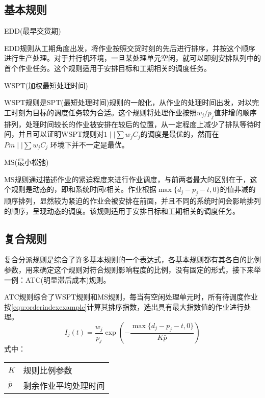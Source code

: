 \subsection{基本规则}
\begin{asparaenum}
\item EDD(最早交货期)

EDD规则从工期角度出发，将作业按照交货时刻的先后进行排序，并按这个顺序进行生产处理。对于并行机环境，一旦某处理单元空闲，就可以即刻安排队列中的首个作业任务。这个规则适用于安排目标和工期相关的调度任务。
\item WSPT(加权最短处理时间)

WSPT规则是SPT(最短处理时间)规则的一般化，从作业的处理时间出发，对以完工时刻为目标的调度任务较为合适。这个规则将处理作业按照$w_j/p_j$值非增的顺序排列，处理时间较长的作业被安排在较后的位置，从一定程度上减少了排队等待时间，并且可以证明WSPT规则对$1\mid \mid \sum w_jC_j$的调度是最优的\cite{pinedo}，然而在$Pm \mid \mid \sum w_jC_j$ 环境下并不一定是最优。

\item MS(最小松弛)
\end{asparaenum}

MS规则通过描述作业的紧迫程度来进行作业调度，与前两者最大的区别在于，这个规则是动态的，即和系统时间$t$相关。作业根据$\max \{d_j - p_j - t , 0\}$的值非减的顺序排列，显然较为紧迫的作业会被安排在前面，并且不同的系统时间会影响排列的顺序，呈现动态的调度。该规则适用于安排目标和工期相关的调度任务。
\subsection{复合规则}
复合分派规则是综合了许多基本规则的一个表达式，各基本规则都有其各自的比例参数，用来确定这个规则对符合规则影响程度的比例，没有固定的形式，接下来举一例：ATC(明显滞后成本)规则。

ATC规则综合了WSPT规则和MS规则，每当有空闲处理单元时，所有待调度作业按\eqref{equ:orderindexexample}计算其排序指数，选出具有最大指数值的作业进行处理。
\begin{equation}
I_j(t) = \frac{w_j}{p_j}\exp\left(-\frac{\max\{d_j - p_j - t, 0\}}{K\bar p}\right) \label{equ:orderindexexample}
\end{equation}
式中：

\begin{tabular}{ll}
$K$ & 规则比例参数\\
$\bar p$ &剩余作业平均处理时间
\end{tabular}

